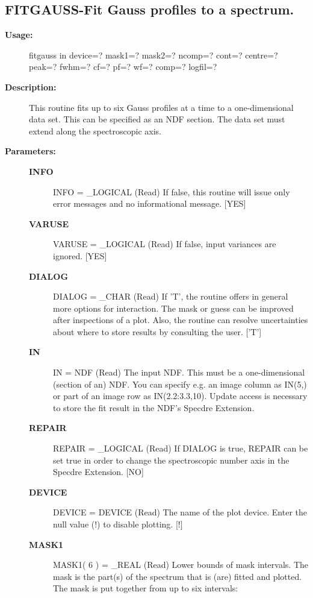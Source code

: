 \subsection{FITGAUSS-\label{FITGAUSS}Fit Gauss profiles to a spectrum.}
\begin{description}

\item [{\bf Usage:}]

   fitgauss in device=? mask1=? mask2=?
      ncomp=? cont=? centre=? peak=? fwhm=? cf=? pf=? wf=?
      comp=? logfil=?


\item [{\bf Description:}]
   This routine fits up to six Gauss profiles at a time to a
   one-dimensional data set. This can be specified as an NDF section.
   The data set must extend along the spectroscopic axis.


\item [{\bf Parameters:}]
\begin{description}
\item [{\bf INFO}]
INFO = _LOGICAL (Read)
   If false, this routine will issue only error messages and no
   informational message. [YES]
\item [{\bf VARUSE}]
VARUSE = _LOGICAL (Read)
   If false, input variances are ignored. [YES]
\item [{\bf DIALOG}]
DIALOG = _CHAR (Read)
   If 'T', the routine offers in general more options for
   interaction. The mask or guess can be improved after
   inspections of a plot. Also, the routine can resolve
   uncertainties about where to store results by consulting the
   user. ['T']
\item [{\bf IN}]
IN = NDF (Read)
   The input NDF. This must be a one-dimensional (section of an)
   NDF. You can specify e.g. an image column as IN(5,) or part of
   an image row as IN(2.2:3.3,10). Update access is necessary to
   store the fit result in the NDF's Specdre Extension.
\item [{\bf REPAIR}]
REPAIR = _LOGICAL (Read)
   If DIALOG is true, REPAIR can be set true in order to change
   the spectroscopic number axis in the Specdre Extension. [NO]
\item [{\bf DEVICE}]
DEVICE = DEVICE (Read)
   The name of the plot device. Enter the null value (!) to
   disable plotting. [!]
\item [{\bf MASK1}]
MASK1( 6 ) = _REAL (Read)
   Lower bounds of mask intervals. The mask is the part(s) of the
   spectrum that is (are) fitted and plotted. The mask is put
   together from up to six intervals:


\end{description}
\end{description}
